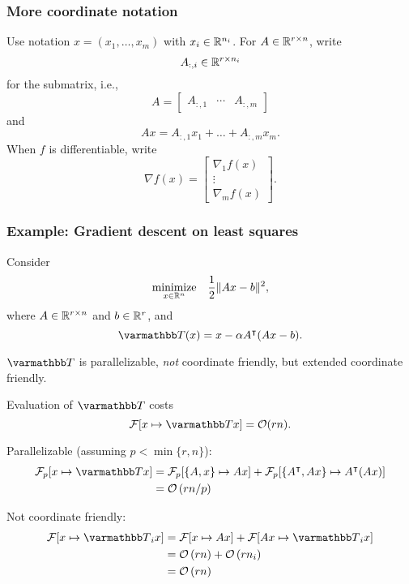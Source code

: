 \documentclass[10pt,mathserif]{beamer}
\begin{document}
\begin{frame}[plain]
\frametitle{More coordinate notation}
Use notation $x=(x_1,\dots,x_m)$ with $x_i\in \mathbb{R}^{n_i}$. For $A\in \mathbb{R}^{r\times n}$, write
\[
A_{:,i}\in \mathbb{R}^{r\times n_i}
\]
for the submatrix, i.e.,
\[
A=\begin{bmatrix}
A_{:,1}&\cdots&A_{:,m}
\end{bmatrix}
\]
and
\[
Ax=A_{:,1}x_{1}+\dots+A_{:,m}x_{m}.
\]
When $f$ is differentiable, write
\[
\nabla f(x)=
\begin{bmatrix}
\nabla_1 f(x)\\
\vdots\\
\nabla_m f(x)
\end{bmatrix}.
\]
\end{frame}

\begin{frame}
\frametitle{Example: Gradient descent on least squares}
Consider
\begin{align*}
\underset{x\in\mathbb{R}^n}{\mbox{minimize}}
\quad \frac{1}{2}\|Ax-b\|^2,
\end{align*}
where $A\in \mathbb{R}^{r\times n}$ and $b\in \mathbb{R}^r$, and
\[
\opT(x)=x-\alpha A^\intercal(Ax-b).
\]

\vspace{0.2in}

$\opT$ is parallelizable, \emph{not} coordinate friendly, but extended coordinate friendly.
\end{frame}


\begin{frame}
Evaluation of $\opT$ costs
\[
\cF[x\mapsto \opT x]=\mathcal{O}(rn).
\]

\vspace{0.2in}
Parallelizable (assuming $p<\min\{r,n\}$):
\begin{align*}
\mathcal{F}_p[x\mapsto \opT x]
&=
\mathcal{F}_p[\{A,x\}\mapsto Ax]
+
\mathcal{F}_p[\{A^\intercal,Ax\}\mapsto A^\intercal(Ax)]\\
&= \order{rn/p}
\end{align*}
\medskip\pause

Not coordinate friendly:
\begin{align*}
\cF[x\mapsto \opT_i x]
&=\cF[x\mapsto Ax] + \cF[ Ax\mapsto \opT_i x]\\
&=\order{rn}+\order{rn_i}\\
&=\order{rn}
\end{align*}
\end{frame}
\end{document}
